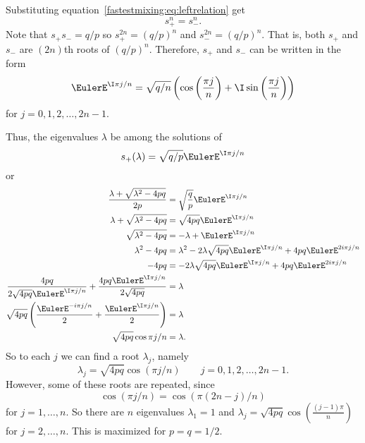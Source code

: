 \documentclass[12pt]{article}
\begin{document}
\begin{solution}
    Substituting equation~\eqref{fastestmixing:eq:leftrelation} get
    \[
        s_{+}^n = s_{-}^n.
    \] Note that \( s_{+}s_{-} =q/p \) so \( s_{+}^{2n} = (q/p)^n \) and
    \( s_{-}^{2n} = (q/p)^n \). That is, both \( s_{+} \) and \( s_{-} \)
    are \( (2n) \)th roots of \( (q/p)^n \).  Therefore, \( s_{+} \) and
    \( s_{-} \) can be written in the form
    \[
        \EulerE^{\I \pi j/n} = \sqrt{q/n} \left( \cos\left( \frac{ \pi j}
        {n} \right) + \I \sin\left( \frac{\pi j}{n} \right) \right)
    \] for \( j = 0, 1, 2, \dots, 2n-1 \).

    Thus, the eigenvalues \( \lambda \) be among the solutions of
    \[
        s_{+}(\lambda) = \sqrt{q/p} \EulerE^{\I \pi j/n}
    \] or
    \begin{align*}
        \frac{\lambda + \sqrt{\lambda^2 - 4pq}}{2p} &= \sqrt{\frac{q}{p}}\EulerE^
        {\I \pi j/n} \\
        \lambda + \sqrt{\lambda^2 - 4pq} &= \sqrt{4pq}\EulerE^{\I \pi
        j/n} \\
        \sqrt{\lambda^2 - 4pq} &= -\lambda + \EulerE^{\I \pi j/n} \\
        \lambda^2 - 4pq &= \lambda^2 - 2\lambda \sqrt{4pq} \EulerE^{\I
        \pi j/n} + 4pq \EulerE^{2 i \pi j/n} \\
        -4pq &= - 2\lambda \sqrt{4pq} \EulerE^{\I \pi j/n} + 4pq \EulerE^
        {2 i \pi j/n} \\
        \frac{4pq}{ 2 \sqrt{4pq} \EulerE^{\I \pi j/n} } + \frac{4pq
        \EulerE^{\I \pi j/n}}{2 \sqrt{4pq}} &= \lambda \\
        \sqrt{4pq} \left( \frac{\EulerE^{-i \pi j/n} }{2} + \frac{\EulerE^
        {\I \pi j/n}}{2} \right) &= \lambda \\
        \sqrt{4pq} \cos{\pi j/n } &= \lambda.  \\
    \end{align*}
    So to each \( j \) we can find a root \( \lambda_j \), namely
    \[
        \lambda_j = \sqrt{4pq} \cos( \pi j/n ) \qquad j = 0,1,2, \dots,
        2n-1.
    \] However, some of these roots are repeated, since
    \[
        \cos( \pi j/n ) = \cos( \pi (2n-j)/n )
    \] for \( j = 1, \dots, n \).  So there are \( n \) eigenvalues \(
    \lambda_1 = 1 \) and \( \lambda_j = \sqrt{4pq} \cos\left( \frac{(j-1)
    \pi}{n} \right) \) for \( j=2, \dots, n \).  This is maximized for \(
    p = q = 1/2 \).
\end{solution}
\end{document}
